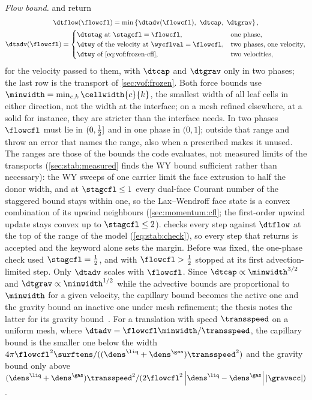 \emph{Flow bound.} 
and  return
\begin{equation}\label{eq:stab:flow-bound}
  \begin{gathered}
  \dtflow(\flowcfl)=\min\curlypar{\dtadv(\flowcfl),\ \dtcap,\ \dtgrav},\\
  \dtadv(\flowcfl)=\begin{cases}
    \dtstag\ \text{at }\stagcfl=\flowcfl, & \text{one phase},\\
    \dtwy\ \text{of the velocity at }\wycflval=\flowcfl, & \text{two phases, one velocity},\\
    \dtwy\ \text{of~\cref{eq:vof:frozen-cfl}}, & \text{two velocities},\\
  \end{cases}
  \end{gathered}
\end{equation}
for the velocity passed to them, with $\dtcap$ and $\dtgrav$ only in two
phases; the last row is the transport of
\cref{sec:vof:frozen}. Both force bounds use
$\minwidth=\min_{c,k}\cellwidth{c}{k}$, the smallest width of all leaf cells
in either direction, not the width at the interface; on a mesh refined
elsewhere, at a solid for instance, they are stricter than the interface
needs. In two phases $\flowcfl$ must lie in $(0,\frac{1}{2}]$ and in one phase in
$(0,1]$; outside that range  and 
throw an error that names the range, also when a prescribed  makes
it unused. The ranges are those of the bounds the code evaluates, not
measured limits of the transports (\cref{sec:stab:measured} finds the WY bound
sufficient rather than necessary): the WY sweeps of one carrier limit the face
extrusion to half the donor width, and at $\stagcfl\le1$ every dual-face
Courant number of the staggered bound stays within one, so the
Lax--Wendroff face state is a convex combination of its upwind neighbours
(\cref{sec:momentum:cfl}; the first-order upwind update stays convex up to
$\stagcfl\le2$). 
checks every step against $\dtflow$ at the top of the range of the model
(\cref{eq:stab:check}), so every step that  returns
is accepted and the keyword alone sets the margin. Before  was
fixed, the one-phase check used $\stagcfl=\half$, and  with
$\flowcfl>\half$ stopped at its first advection-limited step. Only $\dtadv$
scales with $\flowcfl$. Since
$\dtcap\propto\minwidth^{3/2}$ and $\dtgrav\propto\minwidth^{1/2}$ while the
advective bounds are proportional to $\minwidth$ for a given velocity, the
capillary bound becomes the active one and the gravity bound an inactive one
under mesh refinement; the thesis notes the latter for its gravity
bound~. For a translation with speed $\transspeed$ on a
uniform mesh, where $\dtadv=\flowcfl\minwidth/\transspeed$, the capillary
bound is the smaller one below the width
$4\pi{\flowcfl}^{2}\surftens/((\dens^{\liq}+\dens^{\gas})\transspeed^{2})$ and
the gravity bound only above
$(\dens^{\liq}+\dens^{\gas})\transspeed^{2}/(2{\flowcfl}^{2}\abs{\dens^{\liq}-\dens^{\gas}}\abs{\gravacc})$.

